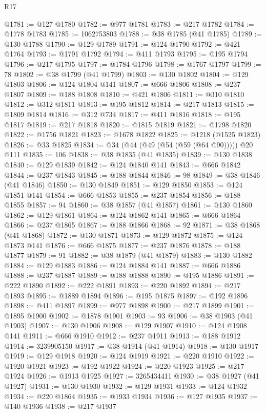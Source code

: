 \begin{lexlean}{R17}
\begin{coremodule}
@1781 := @127 @1780
@1782 := @977 @1781
@1783 := @217 @1782
@1784 := @1778 @1783
@1785 := 1062753803
@1788 := @38 @1785 (@41 @1785)
@1789 := @130 @1788
@1790 := @129 @1789
@1791 := @124 @1790
@1792 := @421 @1764
@1793 := @1791 @1792
@1794 := @411 @1793
@1795 := @195 @1794
@1796 := @217 @1795
@1797 := @1784 @1796
@1798 := @1767 @1797
@1799 := 78
@1802 := @38 @1799 (@41 @1799)
@1803 := @130 @1802
@1804 := @129 @1803
@1806 := @124 @1804 @141
@1807 := @666 @1806
@1808 := @237 @1807
@1809 := @188 @1808
@1810 := @421 @1806
@1811 := @310 @1810
@1812 := @312 @1811
@1813 := @195 @1812
@1814 := @217 @1813
@1815 := @1809 @1814
@1816 := @312 @734
@1817 := @411 @1816
@1818 := @195 @1817
@1819 := @217 @1818
@1820 := @1815 @1819
@1821 := @1798 @1820
@1822 := @1756 @1821
@1823 := @1678 @1822
@1825 := @1218 (@1525 @1823)
@1826 := @33 @1825
@1834 := @34 (@44 (@49 (@54 (@59 (@64 @90))))) @20 @111
@1835 := 106
@1838 := @38 @1835 (@41 @1835)
@1839 := @130 @1838
@1840 := @129 @1839
@1842 := @124 @1840 @141
@1843 := @666 @1842
@1844 := @237 @1843
@1845 := @188 @1844
@1846 := 98
@1849 := @38 @1846 (@41 @1846)
@1850 := @130 @1849
@1851 := @129 @1850
@1853 := @124 @1851 @141
@1854 := @666 @1853
@1855 := @237 @1854
@1856 := @188 @1855
@1857 := 94
@1860 := @38 @1857 (@41 @1857)
@1861 := @130 @1860
@1862 := @129 @1861
@1864 := @124 @1862 @141
@1865 := @666 @1864
@1866 := @237 @1865
@1867 := @188 @1866
@1868 := 92
@1871 := @38 @1868 (@41 @1868)
@1872 := @130 @1871
@1873 := @129 @1872
@1875 := @124 @1873 @141
@1876 := @666 @1875
@1877 := @237 @1876
@1878 := @188 @1877
@1879 := 91
@1882 := @38 @1879 (@41 @1879)
@1883 := @130 @1882
@1884 := @129 @1883
@1886 := @124 @1884 @141
@1887 := @666 @1886
@1888 := @237 @1887
@1889 := @188 @1888
@1890 := @195 @1886
@1891 := @222 @1890
@1892 := @222 @1891
@1893 := @220 @1892
@1894 := @217 @1893
@1895 := @1889 @1894
@1896 := @195 @1875
@1897 := @192 @1896
@1898 := @411 @1897
@1899 := @977 @1898
@1900 := @217 @1899
@1901 := @1895 @1900
@1902 := @1878 @1901
@1903 := 93
@1906 := @38 @1903 (@41 @1903)
@1907 := @130 @1906
@1908 := @129 @1907
@1910 := @124 @1908 @141
@1911 := @666 @1910
@1912 := @237 @1911
@1913 := @188 @1912
@1914 := 3239905150
@1917 := @38 @1914 (@41 @1914)
@1918 := @130 @1917
@1919 := @129 @1918
@1920 := @124 @1919
@1921 := @220 @1910
@1922 := @1920 @1921
@1923 := @192 @1922
@1924 := @220 @1923
@1925 := @217 @1924
@1926 := @1913 @1925
@1927 := 3265434411
@1930 := @38 @1927 (@41 @1927)
@1931 := @130 @1930
@1932 := @129 @1931
@1933 := @124 @1932
@1934 := @220 @1864
@1935 := @1933 @1934
@1936 := @127 @1935
@1937 := @140 @1936
@1938 := @217 @1937

\end{coremodule}
\end{lexlean}
